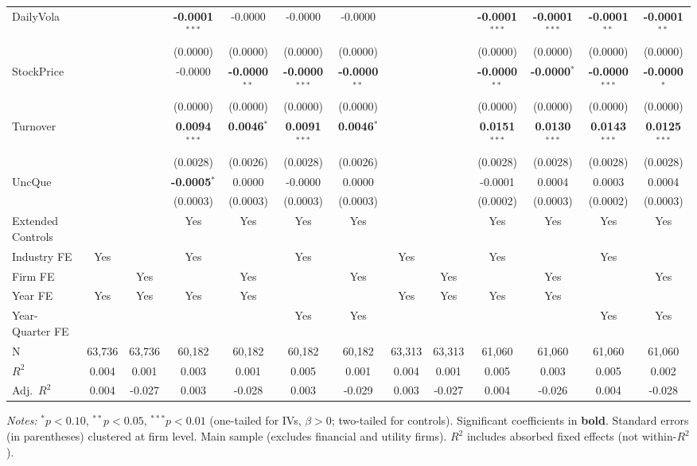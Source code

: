 \begin{landscape}
\begin{table}[H]
\begin{tabular}{lcccccccccccc}
DailyVola &  &  & \textbf{-0.0001}$^{***}$ & -0.0000 & -0.0000 & -0.0000 &  &  & \textbf{-0.0001}$^{***}$ & \textbf{-0.0001}$^{***}$ & \textbf{-0.0001}$^{**}$ & \textbf{-0.0001}$^{**}$ \\
 &  &  & (0.0000) & (0.0000) & (0.0000) & (0.0000) &  &  & (0.0000) & (0.0000) & (0.0000) & (0.0000) \\
StockPrice &  &  & -0.0000 & \textbf{-0.0000}$^{**}$ & \textbf{-0.0000}$^{***}$ & \textbf{-0.0000}$^{**}$ &  &  & \textbf{-0.0000}$^{**}$ & \textbf{-0.0000}$^{*}$ & \textbf{-0.0000}$^{***}$ & \textbf{-0.0000}$^{*}$ \\
 &  &  & (0.0000) & (0.0000) & (0.0000) & (0.0000) &  &  & (0.0000) & (0.0000) & (0.0000) & (0.0000) \\
Turnover &  &  & \textbf{0.0094}$^{***}$ & \textbf{0.0046}$^{*}$ & \textbf{0.0091}$^{***}$ & \textbf{0.0046}$^{*}$ &  &  & \textbf{0.0151}$^{***}$ & \textbf{0.0130}$^{***}$ & \textbf{0.0143}$^{***}$ & \textbf{0.0125}$^{***}$ \\
 &  &  & (0.0028) & (0.0026) & (0.0028) & (0.0026) &  &  & (0.0028) & (0.0028) & (0.0028) & (0.0028) \\
UncQue &  &  & \textbf{-0.0005}$^{*}$ & 0.0000 & -0.0000 & 0.0000 &  &  & -0.0001 & 0.0004 & 0.0003 & 0.0004 \\
 &  &  & (0.0003) & (0.0003) & (0.0003) & (0.0003) &  &  & (0.0002) & (0.0003) & (0.0002) & (0.0003) \\
\midrule
Extended Controls &  &  & Yes & Yes & Yes & Yes &  &  & Yes & Yes & Yes & Yes \\
Industry FE & Yes &  & Yes &  & Yes &  & Yes &  & Yes &  & Yes &  \\
Firm FE &  & Yes &  & Yes &  & Yes &  & Yes &  & Yes &  & Yes \\
Year FE & Yes & Yes & Yes & Yes &  &  & Yes & Yes & Yes & Yes &  &  \\
Year-Quarter FE &  &  &  &  & Yes & Yes &  &  &  &  & Yes & Yes \\
\midrule
N & 63,736 & 63,736 & 60,182 & 60,182 & 60,182 & 60,182 & 63,313 & 63,313 & 61,060 & 61,060 & 61,060 & 61,060 \\
$R^2$ & 0.004 & 0.001 & 0.003 & 0.001 & 0.005 & 0.001 & 0.004 & 0.001 & 0.005 & 0.003 & 0.005 & 0.002 \\
Adj.~$R^2$ & 0.004 & -0.027 & 0.003 & -0.028 & 0.003 & -0.029 & 0.003 & -0.027 & 0.004 & -0.026 & 0.004 & -0.028 \\
\bottomrule
\end{tabular}
\begin{minipage}{\linewidth}
\vspace{2pt}\scriptsize
\textit{Notes:} $^{*}p<0.10$, $^{**}p<0.05$, $^{***}p<0.01$ (one-tailed for IVs, $\beta > 0$; two-tailed for controls).
 Significant coefficients in \textbf{bold}.
 Standard errors (in parentheses) clustered at firm level.
 Main sample (excludes financial and utility firms).
 $R^2$ includes absorbed fixed effects (not within-$R^2$).
\end{minipage}
\end{table}
\end{landscape}